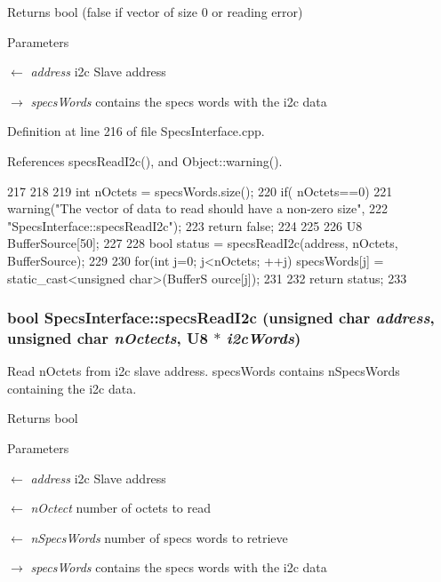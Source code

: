 \begin{DoxyReturn}{Returns}
bool (false if vector of size 0 or reading error) 
\end{DoxyReturn}

\begin{DoxyParams}{Parameters}
\item[\mbox{$\leftarrow$} {\em address}]i2c Slave address \item[\mbox{$\rightarrow$} {\em specsWords}]contains the specs words with the i2c data \end{DoxyParams}


Definition at line 216 of file SpecsInterface.cpp.

References specsReadI2c(), and Object::warning().


\begin{DoxyCode}
217                                                                        {
218 
219   int nOctets = specsWords.size();
220   if( nOctets==0) {
221     warning("The vector of data to read should have a non-zero size",
222             "SpecsInterface::specsReadI2c");
223     return false;
224   }
225 
226   U8 BufferSource[50];
227  
228   bool status = specsReadI2c(address, nOctets, BufferSource);
229 
230   for(int j=0; j<nOctets; ++j) specsWords[j] = static_cast<unsigned char>(BufferS
      ource[j]);
231 
232   return status;
233 }
\end{DoxyCode}
\hypertarget{classSpecsInterface_a7e9a0fe69a998e624ca2d7339b61bcb5}{
\subsubsection[{specsReadI2c}]{\setlength{\rightskip}{0pt plus 5cm}bool SpecsInterface::specsReadI2c (unsigned char {\em address}, \/  unsigned char {\em nOctects}, \/  {\bf U8} $\ast$ {\em i2cWords})}}
\label{classSpecsInterface_a7e9a0fe69a998e624ca2d7339b61bcb5}
Read nOctets from i2c slave address. specsWords contains nSpecsWords containing the i2c data.

\begin{DoxyReturn}{Returns}
bool 
\end{DoxyReturn}

\begin{DoxyParams}{Parameters}
\item[\mbox{$\leftarrow$} {\em address}]i2c Slave address \item[\mbox{$\leftarrow$} {\em nOctect}]number of octets to read \item[\mbox{$\leftarrow$} {\em nSpecsWords}]number of specs words to retrieve \item[\mbox{$\rightarrow$} {\em specsWords}]contains the specs words with the i2c data \end{DoxyParams}


